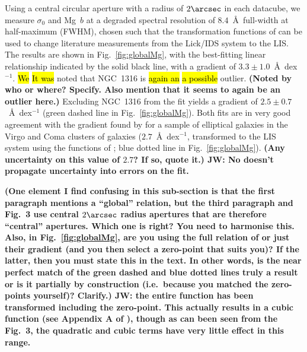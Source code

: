 \documentclass[a4paper,fleqn,usenatbib]{mnras}
\DeclareRobustCommand{\removed}[1]{{\sethlcolor{red}\hl{#1}}}
\DeclareRobustCommand{\added}[1]{{\sethlcolor{green}\hl{#1}}}
\begin{document}
Using a central circular aperture with a radius of $2\arcsec$ in each
datacube, we measure $\sigma_0$ and Mg~$b$ at a degraded spectral
resolution of $8.4$~\AA\ full-width at half-maximum (FWHM), chosen
such that the transformation functions of \citet{Vazdekis2010} can be
used to change literature measurements from the Lick/IDS system to the
LIS. The results are shown in Fig.~\ref{fig:globalMg}, with the
best-fitting linear relationship
indicated by the solid black line, with a gradient of
$3.3\pm1.0$~\AA~dex$^{-1}$. \added{We} \removed{It was} noted that NGC~1316 is \added{again an} \removed{a possible}
outlier. {\bf (Noted by who or where? Specify. Also mention that it
  seems to again be an outlier here.)} Excluding NGC~1316 from the fit
yields a gradient of $2.5\pm0.7$~\AA~dex$^{-1}$ (green dashed line in
Fig.~\ref{fig:globalMg}). Both fits are in very good agreement with
the gradient found by \citet{Ziegler1997} for a sample of elliptical
galaxies in the Virgo and Coma clusters of galaxies
($2.7$~\AA~dex$^{-1}$, transformed to the LIS system using the
functions of \citealt{Vazdekis2010}; blue dotted line in
Fig.~\ref{fig:globalMg}). {\bf (Any uncertainty on this value of
  $2.7$? If so, quote it.) JW: No \citet{Ziegler1997} doesn't propagate uncertainty into errors on the fit.}

{\bf (One element I find confusing in this sub-section is that the
  first paragraph mentions a ``global'' relation, but the third
  paragraph and Fig.~3 use central $2\arcsec$ radius apertures that
  are therefore ``central'' apertures. Which one is right? You need to
  harmonise this. Also, in Fig.~\ref{fig:globalMg}, are you using the
  full relation of \citet{Ziegler1997} or just their gradient (and you
  then select a zero-point that suits you)? If the latter, then you
  must state this in the text. In other words, is the near perfect
  match of the green dashed and blue dotted lines truly a result or is
  it partially by construction (i.e.\ because you matched the
  zero-points yourself)? Clarify.) JW: the entire function has been transformed including the zero-point. This actually results in a cubic function (see Appendix A of \citealt{Vazdekis2010}), though as can been seen from the Fig.~3, the quadratic and cubic terms have very little effect in this range.}
\end{document}
